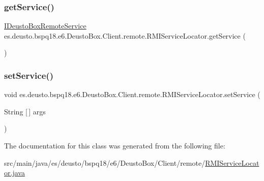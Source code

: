 \subsubsection{\texorpdfstring{get\+Service()}{getService()}}
{\footnotesize\ttfamily \mbox{\hyperlink{interfacees_1_1deusto_1_1bspq18_1_1e6_1_1_deusto_box_1_1_server_1_1remote_1_1_i_deusto_box_remote_service}{I\+Deusto\+Box\+Remote\+Service}} es.\+deusto.\+bspq18.\+e6.\+Deusto\+Box.\+Client.\+remote.\+R\+M\+I\+Service\+Locator.\+get\+Service (\begin{DoxyParamCaption}{ }\end{DoxyParamCaption})}

\mbox{\label{classes_1_1deusto_1_1bspq18_1_1e6_1_1_deusto_box_1_1_client_1_1remote_1_1_r_m_i_service_locator_a1749b62b640d1de7edbf2b26dcf3cd31}} 
\subsubsection{\texorpdfstring{set\+Service()}{setService()}}
{\footnotesize\ttfamily void es.\+deusto.\+bspq18.\+e6.\+Deusto\+Box.\+Client.\+remote.\+R\+M\+I\+Service\+Locator.\+set\+Service (\begin{DoxyParamCaption}\item[{String \mbox{[}$\,$\mbox{]}}]{args }\end{DoxyParamCaption})}



The documentation for this class was generated from the following file\+:\begin{DoxyCompactItemize}
\item 
src/main/java/es/deusto/bspq18/e6/\+Deusto\+Box/\+Client/remote/\mbox{\hyperlink{_r_m_i_service_locator_8java}{R\+M\+I\+Service\+Locator.\+java}}\end{DoxyCompactItemize}
